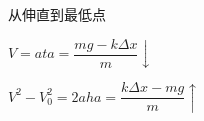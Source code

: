 \begin{problem}
从伸直到最低点
\begin{solution}
$V=at$\qquad $a=\dfrac{mg-k\Delta x}{m}\downarrow$

$V^2-V_0^2=2ah$\qquad $a=\dfrac{k\Delta x-mg}{m}\uparrow$
\end{solution}
\end{problem}
